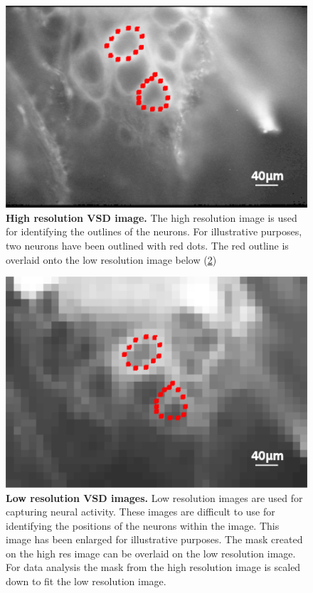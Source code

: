 \begin{figure}[H]
	\centering
		\includegraphics[width=\columnwidth]{graphics/vsd_hires.png}
		\caption[High resolution \ac{VSD} image.]{\textbf{High resolution \ac{VSD} image.} The high resolution image is used for identifying the outlines of the neurons. For illustrative purposes, two neurons have been outlined with red dots. The red outline is overlaid onto the low resolution image below (\ref{fig:vsd_lowres})}
		\label{fig:vsd_hires}
\end{figure}
\begin{figure}[H]
	\centering
		\includegraphics[width=\columnwidth]{graphics/vsd_lowres.png}
		\caption[Low resolution \ac{VSD} images.]{\textbf{Low resolution \ac{VSD} images.} Low resolution images are used for capturing neural activity. These images are difficult to use for identifying the positions of the neurons within the image. This image has been enlarged for illustrative purposes. The mask created on the high res image can be overlaid on the low resolution image. For data analysis the mask from the high resolution image is scaled down to fit the low resolution image.}
		\label{fig:vsd_lowres}
\end{figure}

